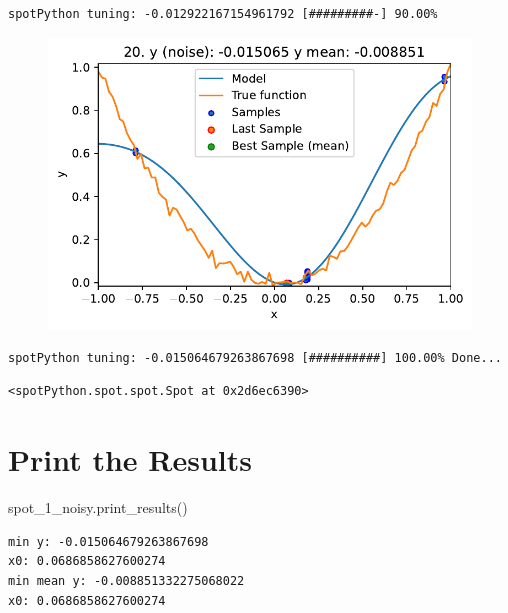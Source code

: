 \documentclass[
  letterpaper,
  DIV=11,
  numbers=noendperiod]{scrreprt}
\newenvironment{Shaded}{\begin{snugshade}}{\end{snugshade}}
\newcommand{\NormalTok}[1]{\textcolor[rgb]{0.00,0.23,0.31}{#1}}
\begin{document}
\begin{verbatim}
spotPython tuning: -0.012922167154961792 [#########-] 90.00% 
\end{verbatim}

\begin{figure}[H]

{\centering \includegraphics{013_num_spot_noisy_files/figure-pdf/cell-6-output-14.pdf}

}

\end{figure}

\begin{verbatim}
spotPython tuning: -0.015064679263867698 [##########] 100.00% Done...
\end{verbatim}

\begin{verbatim}
<spotPython.spot.spot.Spot at 0x2d6ec6390>
\end{verbatim}

\hypertarget{print-the-results-3}{%
\section{Print the Results}\label{print-the-results-3}}

\begin{Shaded}
\begin{Highlighting}[]
\NormalTok{spot\_1\_noisy.print\_results()}
\end{Highlighting}
\end{Shaded}

\begin{verbatim}
min y: -0.015064679263867698
x0: 0.0686858627600274
min mean y: -0.008851332275068022
x0: 0.0686858627600274
\end{verbatim}
\end{document}
